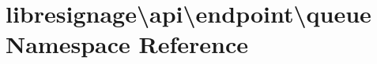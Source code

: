 \hypertarget{namespacelibresignage_1_1api_1_1endpoint_1_1queue}{}\section{libresignage\textbackslash{}api\textbackslash{}endpoint\textbackslash{}queue Namespace Reference}
\label{namespacelibresignage_1_1api_1_1endpoint_1_1queue}

